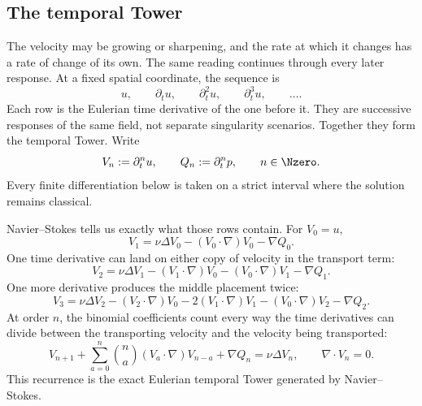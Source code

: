 \subsection{The temporal Tower}\label{sub:BodyFiniteTimeResponseEscalation}

The velocity may be growing or sharpening, and the rate at which it changes has a rate of change of its own.
The same reading continues through every later response.
At a fixed spatial coordinate, the sequence is
\[
  u,
  \qquad
  \partial_tu,
  \qquad
  \partial_t^2u,
  \qquad
  \partial_t^3u,
  \qquad
  \ldots .
\]
Each row is the Eulerian time derivative of the one before it.
They are successive responses of the same field, not separate singularity scenarios.
Together they form the temporal Tower.
Write
\begin{equation}\label{eq:TemporalTowerDefinitionBody}
  V_n:=\partial_t^nu,
  \qquad
  Q_n:=\partial_t^np,
  \qquad
  n\in\Nzero.
\end{equation}
Every finite differentiation below is taken on a strict interval where the solution remains classical.

Navier--Stokes tells us exactly what those rows contain.
For \(V_0=u\),
\[
  V_1
  =\nu\Delta V_0
  -(V_0\cdot\nabla)V_0
  -\nabla Q_0.
\]
One time derivative can land on either copy of velocity in the transport term:
\[
  V_2
  =\nu\Delta V_1
  -(V_1\cdot\nabla)V_0
  -(V_0\cdot\nabla)V_1
  -\nabla Q_1.
\]
One more derivative produces the middle placement twice:
\[
  V_3
  =\nu\Delta V_2
  -(V_2\cdot\nabla)V_0
  -2(V_1\cdot\nabla)V_1
  -(V_0\cdot\nabla)V_2
  -\nabla Q_2.
\]
At order \(n\), the binomial coefficients count every way the time derivatives can divide between the transporting velocity and the velocity being transported:
\begin{equation}\label{eq:BodyTemporalVelocityRecurrence}
  V_{n+1}
  +\sum_{a=0}^{n}\binom{n}{a}(V_a\cdot\nabla)V_{n-a}
  +\nabla Q_n
  =\nu\Delta V_n,
  \qquad
  \nabla\cdot V_n=0.
\end{equation}
This recurrence is the exact Eulerian temporal Tower generated by Navier--Stokes.

